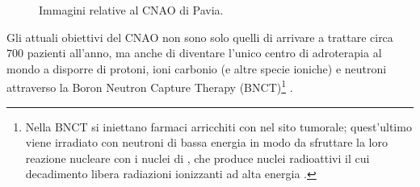 \documentclass[12pt,a4paper,twoside]{report}
\begin{document}
	\begin{figure}[H]
		\centering
		\hfill
		\par 
		\caption{Immagini relative al CNAO di Pavia.}
		\label{fig:cnao}
	\end{figure}
	Gli attuali obiettivi del CNAO non sono solo quelli di arrivare a trattare circa $700$ pazienti all’anno, ma anche di diventare l’unico centro di adroterapia al mondo a disporre di protoni, ioni carbonio (e altre specie ioniche) e neutroni attraverso la Boron Neutron Capture Therapy (BNCT)\footnote{Nella BNCT si iniettano farmaci arricchiti con  nel sito tumorale; quest'ultimo viene irradiato con neutroni di bassa energia in modo da sfruttare la loro reazione nucleare con i nuclei di , che produce nuclei radioattivi il cui decadimento libera radiazioni ionizzanti ad alta energia \cite{asimmetrie_curareCLP}.} \cite{cnao3,cnao4}.
\end{document}
